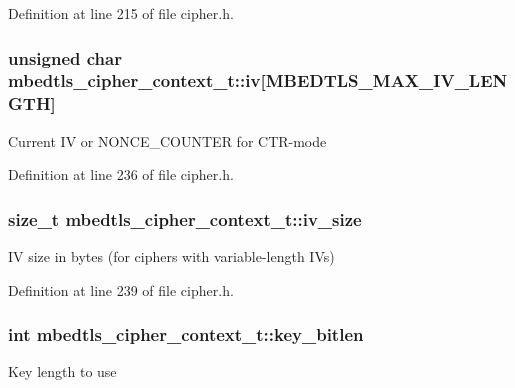 Definition at line 215 of file cipher.\-h.

\hypertarget{structmbedtls__cipher__context__t_a19262f2c275b31180e7412f4bcef0e7f}{
\subsubsection[{iv}]{\setlength{\rightskip}{0pt plus 5cm}unsigned char mbedtls\-\_\-cipher\-\_\-context\-\_\-t\-::iv\mbox{[}{\bf M\-B\-E\-D\-T\-L\-S\-\_\-\-M\-A\-X\-\_\-\-I\-V\-\_\-\-L\-E\-N\-G\-T\-H}\mbox{]}}}\label{structmbedtls__cipher__context__t_a19262f2c275b31180e7412f4bcef0e7f}
Current I\-V or N\-O\-N\-C\-E\-\_\-\-C\-O\-U\-N\-T\-E\-R for C\-T\-R-\/mode 

Definition at line 236 of file cipher.\-h.

\hypertarget{structmbedtls__cipher__context__t_af11d1d21da68ef00a46d96d9de326206}{
\subsubsection[{iv\-\_\-size}]{\setlength{\rightskip}{0pt plus 5cm}size\-\_\-t mbedtls\-\_\-cipher\-\_\-context\-\_\-t\-::iv\-\_\-size}}\label{structmbedtls__cipher__context__t_af11d1d21da68ef00a46d96d9de326206}
I\-V size in bytes (for ciphers with variable-\/length I\-Vs) 

Definition at line 239 of file cipher.\-h.

\hypertarget{structmbedtls__cipher__context__t_ac949d799444e6379acf0125891c04763}{
\subsubsection[{key\-\_\-bitlen}]{\setlength{\rightskip}{0pt plus 5cm}int mbedtls\-\_\-cipher\-\_\-context\-\_\-t\-::key\-\_\-bitlen}}\label{structmbedtls__cipher__context__t_ac949d799444e6379acf0125891c04763}
Key length to use 

